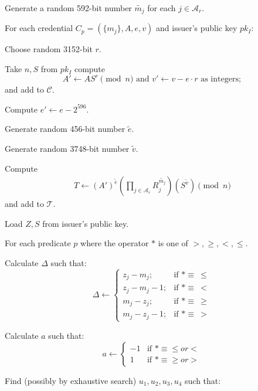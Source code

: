 \begin{legal}
\item Generate a random 592-bit number $\widetilde{m_j}$ for each $j \in \mathcal{A}_{\overline{r}}$.
\item For each credential $C_p = (\{m_j\},A,e,v)$ and issuer's
public key $pk_I$:
\begin{legal}
\item Choose random 3152-bit $r$.
\item Take $n,S$ from $pk_I$ compute 
\begin{equation}\label{eq:aprime}
A' \leftarrow A S^{r}\pmod{n}
\text{ and } v' \leftarrow v - e\cdot r\text{ as integers};
\end{equation}
and add to $\mathcal{C}$.
\item Compute $e' \leftarrow e - 2^{596}$.
\item Generate random 456-bit number $\widetilde{e}$.
\item Generate random 3748-bit number $\widetilde{v}$.
\item Compute 
\begin{align}
T \leftarrow (A')^{\widetilde{e}}\left(\prod_{j\in \mathcal{A}_{\overline{r}}} R_j^{\widetilde{m_j}}\right)(S^{\widetilde{v}})\pmod{n}
\end{align}
and add to $\mathcal{T}$.
\end{legal}
\item Load $Z,S$ from issuer's public key.
\item For each predicate $p$ where the operator $*$ is one of $>, \geq, <, \leq$.
\begin{legal}
\item Calculate $\Delta$ such that:
$$
\Delta \leftarrow \begin{cases}
z_j-m_j; & \mbox{if } * \equiv\ \leq\\
z_j-m_j-1; & \mbox{if } * \equiv\ <\\
m_j-z_j; & \mbox{if } * \equiv\ \geq\\
m_j-z_j-1; & \mbox{if } * \equiv\ >
\end{cases}
$$
\item Calculate $a$ such that:
$$
a \leftarrow \begin{cases}
-1 & \mbox{if } * \equiv \leq or <\\
1  & \mbox{if } * \equiv \geq or >
\end{cases}
$$
 \item Find (possibly by exhaustive search) $u_1, u_2,u_3, u_4$ such that:
 \begin{align}

\end{align}
\end{legal}
\end{legal}
